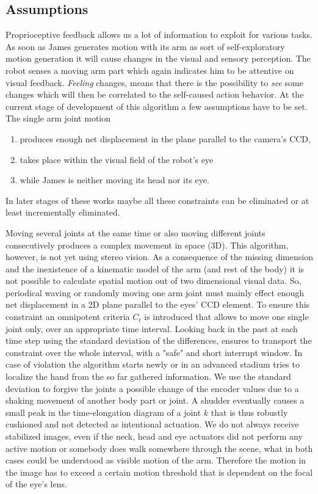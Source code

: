 \documentclass[conference]{IEEEtran}
\begin{document}
\subsection{Assumptions}\label{method:localization:assumptions}
Proprioceptive feedback allows us a lot of information to exploit for various tasks. As soon as James generates motion with its arm as sort of self-exploratory motion generation it will cause changes in the visual and sensory perception. The robot senses a moving arm part which again indicates him to be attentive on visual feedback. \textit{Feeling} changes, means that there is the possibility to \textit{see} some changes which will then be correlated to the self-caused action behavior. At the current stage of development of this algorithm a few assumptions have to be set. The single arm joint motion
\begin{enumerate}
	\item produces enough net displacement in the plane parallel to the camera's CCD,
	\item takes place within the visual field of the robot's eye
	\item while James is neither moving its head nor its eye.
\end{enumerate}
In later stages of these works maybe all these constraints can be eliminated or at least incrementally eliminated.

Moving several joints at the same time or also moving different joints consecutively produces a complex movement in space (3D). This algorithm, however, is not yet using stereo vision. As a consequence of the missing dimension and the inexistence of a kinematic model of the arm (and rest of the body) it is not possible to calculate spatial motion out of two dimensional visual data. So, periodical waving or randomly moving one arm joint must mainly effect enough net displacement in a 2D plane parallel to the eyes' CCD element. 
To ensure this constraint an omnipotent criteria $ C_t $ is introduced that allows to move one single joint only, over an appropriate time interval. Looking back in the past at each time step using the standard deviation of the differences, ensures to transport the constraint over the whole interval, with a "safe" and short interrupt window.  In case of violation the algorithm starts newly or in an advanced stadium tries to localize the hand from the so far gathered information. We use the standard deviation to forgive the joints a possible change of the encoder values due to a shaking movement of another body part or joint. A shudder eventually causes a small peak in the time-elongation diagram of a joint $k$ that is thus robustly cushioned and not detected as intentional actuation.
%
We do not always receive stabilized images, even if the neck, head and eye actuators did not perform any active motion or somebody does walk somewhere through the scene, what in both cases could be understood as visible motion of the arm. Therefore the motion in the image has to exceed a certain motion threshold that is dependent on the focal of the eye's lens.
%
%
%
\end{document}
